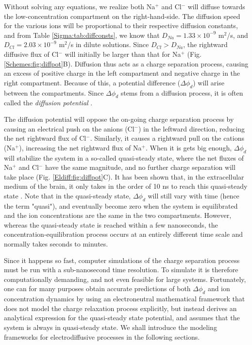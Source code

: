 Without solving any equations, we realize both Na$^+$ and Cl$^-$ will diffuse towards the low-concentration compartment on the right-hand-side. The diffusion speed for the various ions will be proportional to their respective diffusion constants, and from Table \ref{Sigma:tab:diffconsts}, we know that $D_{Na} = 1.33 \times 10^{-9}$ m$^2$/s, and $D_{Cl} = 2.03 \times 10^{-9}$ m$^2$/s in dilute solutions. Since $D_{Cl} > D_{Na}$, the rightward diffusive flux of Cl$^-$ will initially be larger than that for Na$^+$  (Fig. \ref{Schemes:fig:diffpot}B). Diffusion thus acts as a charge separation process, causing an excess of positive charge in the left compartment and negative charge in the right compartment. Because of this, a potential difference ($\Delta \phi_d$) will arise between the compartments. Since $\Delta \phi_d$ stems from a diffusion process, it is often called the \textit{diffusion potential} . 

The diffusion potential will oppose the on-going charge separation process by causing an electrical push on the anions (Cl$^-$) in the leftward direction, reducing the net rightward flux of Cl$^-$. Similarly, it causes a rightward pull on the cations (Na$^+$), increasing the net rightward flux of Na$^+$. When it is gets big enough, $\Delta \phi_d$ will stabilize the system in a so-called quasi-steady state, where the net fluxes of Na$^+$ and Cl$^-$ have the same magnitude, and no further charge separation will take place (Fig. \ref{Eldiff:fig:diffpot}C). It has been shown that, in the extracellular medium of the brain, it only takes in the order of 10 ns to reach this quasi-steady state \cite{Solbra2018}. Note that in the quasi-steady state, $\Delta \phi_d$ will still vary with time (hence the term "quasi"), and eventually become zero when the system is equilibrated and the ion concentrations are the same in the two compartments. However, whereas the quasi-steady state is reached within a few nanoseconds, the concentration-equilibration process occurs at an entirely different time scale and normally takes seconds to minutes.

Since it happens so fast, computer simulations of the charge separation process must be run with a sub-nanosecond time resolution. To simulate it is therefore computationally demanding, and not even feasible for large systems. Fortunately, one can for many purposes obtain accurate predictions of both $\Delta \phi_d$ and ion concentration dynamics by using an electroneutral mathematical framework that does not model the charge relaxation process explicitly, but instead derives an analytical expression for the quasi-steady state potential, and assumes that the system is always in quasi-steady state. We shall introduce the modeling frameworks for electrodiffusive processes in the following sections. 

